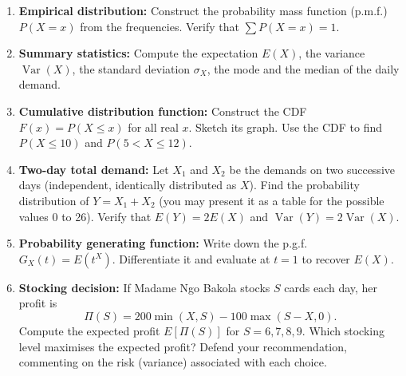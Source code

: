 \documentclass[11pt]{article}
\begin{document}
\begin{enumerate}
    \item \textbf{Empirical distribution:} Construct the probability mass function (p.m.f.) \(P(X=x)\) from the frequencies. Verify that \(\sum P(X=x)=1\).
    \item \textbf{Summary statistics:} Compute the expectation \(E(X)\), the variance \(\operatorname{Var}(X)\), the standard deviation \(\sigma_X\), the mode and the median of the daily demand.
    \item \textbf{Cumulative distribution function:} Construct the CDF \(F(x)=P(X\le x)\) for all real \(x\). Sketch its graph. Use the CDF to find \(P(X\le 10)\) and \(P(5<X\le 12)\).
    \item \textbf{Two-day total demand:} Let \(X_1\) and \(X_2\) be the demands on two successive days (independent, identically distributed as \(X\)). Find the probability distribution of \(Y=X_1+X_2\) (you may present it as a table for the possible values 0 to 26). Verify that \(E(Y)=2E(X)\) and \(\operatorname{Var}(Y)=2\operatorname{Var}(X)\).
    \item \textbf{Probability generating function:} Write down the p.g.f. \(G_X(t)=E(t^X)\). Differentiate it and evaluate at \(t=1\) to recover \(E(X)\).
    \item \textbf{Stocking decision:} If Madame Ngo Bakola stocks \(S\) cards each day, her profit is 
    \[
    \Pi(S)=200\min(X,S)-100\max(S-X,0).
    \]
    Compute the expected profit \(E[\Pi(S)]\) for \(S=6,7,8,9\). Which stocking level maximises the expected profit? Defend your recommendation, commenting on the risk (variance) associated with each choice.
\end{enumerate}
\end{document}
